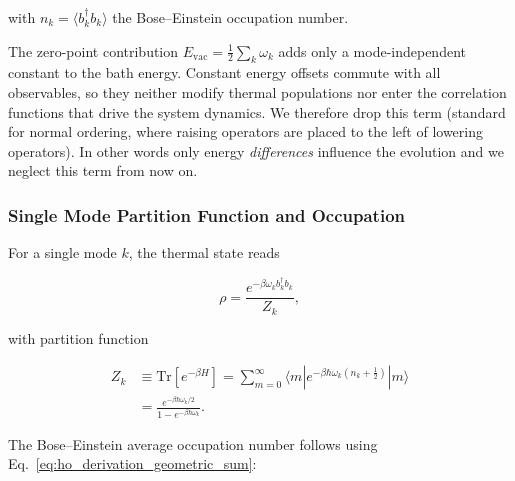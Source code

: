 \noindent
with $n_k = \langle b_k^{\dagger} b_k \rangle$ the Bose--Einstein occupation number.


\noindent
The zero-point contribution $E_{\text{vac}} = \tfrac{1}{2} \sum_k \omega_k$ adds only a mode-independent constant to the bath energy. Constant energy offsets commute with all observables, so they neither modify thermal populations nor enter the correlation functions that drive the system dynamics. We therefore drop this term (standard for normal ordering, where raising operators are placed to the left of lowering operators). In other words only energy \emph{differences} influence the evolution and we neglect this term from now on.



\subsubsection{Single Mode Partition Function and Occupation}
\label{subsubsec:single_mode}

\noindent
For a single mode $k$, the thermal state reads

\begin{equation} \label{eq:ho_single_mode_density_matrix}
	\rho = \frac{e^{-\beta \omega_k b^{\dagger}_k b_k}}{Z_k},
\end{equation}

\noindent
with partition function

\begin{align} \label{eq:ho_partition_function}
        Z_k & \equiv \mathrm{Tr}\left[e^{-\beta H}\right] = \sum_{m=0}^{\infty} \langle m | e^{-\beta \hbar \omega_k (n_k + \frac{1}{2})} | m \rangle \\
        & = \frac{e^{-\beta \hbar \omega_k / 2}}{1 - e^{-\beta \hbar \omega_k}}.
\end{align}

\noindent
The Bose--Einstein average occupation number follows using Eq.~\eqref{eq:ho_derivation_geometric_sum}:

